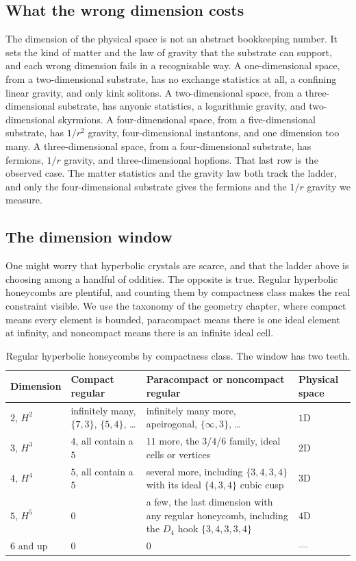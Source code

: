 \subsection{What the wrong dimension costs}

The dimension of the physical space is not an abstract bookkeeping number. It sets the kind of matter and the law
of gravity that the substrate can support, and each wrong dimension fails in a recognisable way. A
one-dimensional space, from a two-dimensional substrate, has no exchange statistics at all, a confining linear
gravity, and only kink solitons. A two-dimensional space, from a three-dimensional substrate, has anyonic
statistics, a logarithmic gravity, and two-dimensional skyrmions. A four-dimensional space, from a
five-dimensional substrate, has $1/r^2$ gravity, four-dimensional instantons, and one dimension too many. A
three-dimensional space, from a four-dimensional substrate, has fermions, $1/r$ gravity, and three-dimensional
hopfions. That last row is the observed case. The matter statistics and the gravity law both track the ladder,
and only the four-dimensional substrate gives the fermions and the $1/r$ gravity we measure.

\subsection{The dimension window}

One might worry that hyperbolic crystals are scarce, and that the ladder above is choosing among a handful of
oddities. The opposite is true. Regular hyperbolic honeycombs are plentiful, and counting them by compactness
class makes the real constraint visible. We use the taxonomy of the geometry chapter, where compact means every
element is bounded, paracompact means there is one ideal element at infinity, and noncompact means there is an
infinite ideal cell.

\begin{table}[ht]
\centering
\begin{tabularx}{\textwidth}{p{2.2cm}p{2.6cm}Xp{1.6cm}}
\toprule
Dimension & Compact regular & Paracompact or noncompact regular & Physical space \\
\midrule
$2$, $H^2$ & infinitely many, $\{7,3\}$, $\{5,4\}$, \dots & infinitely many more, apeirogonal, $\{\infty,3\}$, \dots & $1$D \\
$3$, $H^3$ & $4$, all contain a $5$ & $11$ more, the $3$/$4$/$6$ family, ideal cells or vertices & $2$D \\
$4$, $H^4$ & $5$, all contain a $5$ & several more, including $\{3,4,3,4\}$ with its ideal $\{4,3,4\}$ cubic cusp & $3$D \\
$5$, $H^5$ & $0$ & a few, the last dimension with any regular honeycomb, including the $D_4$ hook $\{3,4,3,3,4\}$ & $4$D \\
$6$ and up & $0$ & $0$ & --- \\
\bottomrule
\end{tabularx}
\caption{Regular hyperbolic honeycombs by compactness class. The window has two teeth.}
\end{table}

